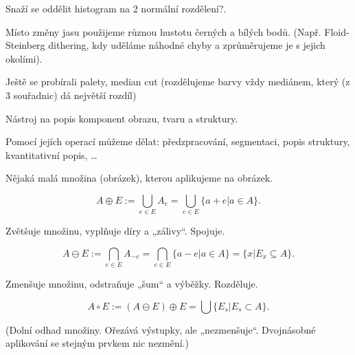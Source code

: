 \documentclass[12pt]{article}					%
\begin{document}
\begin{definice}
	Snaží se oddělit histogram na 2 normální rozdělení?.
\end{definice}

\begin{definice}[Dithering]
	Místo změny jasu použijeme různou hustotu černých a bílých bodů. (Např. Floid-Steinberg dithering, kdy uděláme náhodné chyby a zprůměrujeme je s jejich okolími).
\end{definice}


\begin{poznamka}
	Ještě se probírali palety, median cut (rozdělujeme barvy vždy mediánem, který (z 3 souřadnic) dá největší rozdíl)
\end{poznamka}

\begin{definice}
	Nástroj na popis komponent obrazu, tvaru a struktury.

	Pomocí jejích operací můžeme dělat: předzpracování, segmentaci, popis struktury, kvantitativní popis, …
\end{definice}

\begin{definice}
	Nějaká malá množina (obrázek), kterou aplikujeme na obrázek.
\end{definice}

\begin{definice}
	$$ A \oplus E := \bigcup_{e \in E} A_e = \bigcup_{e \in E} \{a + e | a \in A\}. $$

	Zvětšuje množinu, vyplňuje díry a „zálivy“. Spojuje.
\end{definice}

\begin{definice}[Eroze]
	$$ A \ominus E := \bigcap_{e \in E} A_{-e} = \bigcap_{e \in E} \{a - e | a \in A\} = \{x | E_x \subseteq A\}. $$

	Zmenšuje množinu, odstraňuje „šum“ a výběžky. Rozděluje.
\end{definice}

\begin{definice}[Otevření]
	$$ A \circ E := (A \ominus E) \oplus E = \bigcup \{E_s| E_s \subset A\}. $$

	(Dolní odhad množiny. Ořezává výstupky, ale „nezmenšuje“. Dvojnásobné aplikování se stejným prvkem nic nezmění.)
\end{definice}
\end{document}
